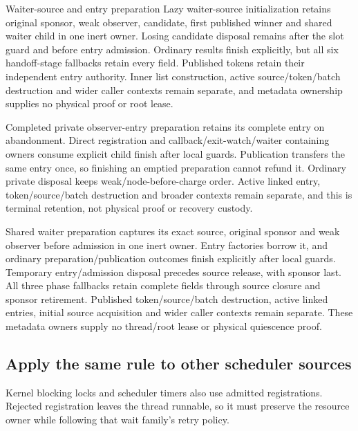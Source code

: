 \begin{implementationdetail}{Waiter-source and entry preparation}
Lazy waiter-source initialization retains original sponsor, weak observer,
candidate, first published winner and shared waiter child in one inert owner.
Losing candidate disposal remains after the slot guard and before entry admission.
Ordinary results finish explicitly, but all six handoff-stage fallbacks retain every
field. Published tokens retain their independent entry authority. Inner list
construction, active source/token/batch destruction and wider caller contexts
remain separate, and metadata ownership supplies no physical proof or root lease.

Completed private observer-entry preparation retains its complete entry on
abandonment. Direct registration and callback/exit-watch/waiter containing
owners consume explicit child finish after local guards. Publication transfers
the same entry once, so finishing an emptied preparation cannot refund it.
Ordinary private disposal keeps weak/node-before-charge order. Active linked
entry, token/source/batch destruction and broader contexts remain separate, and
this is terminal retention, not physical proof or recovery custody.

Shared waiter preparation captures its exact source, original sponsor and weak
observer before admission in one inert owner. Entry factories borrow it, and
ordinary preparation/publication outcomes finish explicitly after local guards.
Temporary entry/admission disposal precedes source release, with sponsor last.
All three phase fallbacks retain complete fields through source closure and
sponsor retirement. Published token/source/batch destruction, active linked
entries, initial source acquisition and wider caller contexts remain separate.
These metadata owners supply no thread/root lease or physical quiescence proof.
\end{implementationdetail}

\subsection{Apply the same rule to other scheduler sources}

Kernel blocking locks and scheduler timers also use admitted registrations.
Rejected registration leaves the thread runnable, so it must preserve the resource
owner while following that wait family's retry policy.

